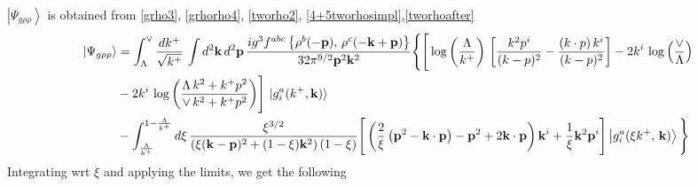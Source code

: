 \documentclass[aps,prd,amsmath,amssymb,nofootinbib]{revtex4-2}
\numberwithin{equation}{section}
\begin{document}
$\left|\Psi_{g\rho\rho}\right\rangle$ is obtained from \eqref{grho3}, \eqref{grhorho4}, \eqref{tworho2}, \eqref{4+5tworhosimpl},\eqref{tworhoafter}
\begin{align}\label{combinedgrhorho}
    \left|\Psi_{g\rho\rho}\right\rangle & =  \int_{\Lambda}^{\vee}\frac{dk^{+}}{\sqrt{k^{+}}}\,\int d^{2}\mathbf{k}\, d^{2}\mathbf{p}\,\frac{ig^{3}f^{abc}\left\{ \rho^{b}(-\mathbf{p}),\,\rho^{c}(-\mathbf{k}+\mathbf{p})\right\}}{32\pi^{9/2}\mathbf{p}^{2}\mathbf{k}^{2}}\Bigg\{\Bigg[\log{\left(\frac{\Lambda}{k^{+}}\right)}\,\left[\frac{k^{2}p^{i}}{(k-p)^{2}}-\frac{(k\cdot p)\,k^{i}}{(k-p)^{2}}\right]-2k^{i}\,\log{\left(\frac{\vee}{\Lambda}\right)}\notag \\ & -2k^{i}\,\log{\left(\frac{\Lambda\,k^{2} + k^{+}p^{2}}{\vee\, k^{2}+k^{+}p^{2}}\right)}\Bigg]\, \ket{g^{a}_{i}(k^{+},\mathbf{k})} \notag \\ & -\int_{\frac{\Lambda}{k^{+}}}^{1-\frac{\Lambda}{k^{+}}}d\xi\,\frac{\xi^{3/2}}{\left(\xi(\mathbf{k}-\mathbf{p})^{2}+(1-\xi)\mathbf{k}^{2}\right)(1-\xi)}\Bigg[\left(\frac{2}{\xi}\left(\mathbf{p}^{2}-\mathbf{k}\cdot\mathbf{p}\right)-\mathbf{p}^{2}+2\mathbf{k}\cdot\mathbf{p}\right)\mathbf{k}^{i} +\frac{1}{\xi}\mathbf{k}^{2}\mathbf{p}^{i}\Bigg]\left|g_{i}^{a}(\xi k^{+},\,\mathbf{k})\right\rangle \Bigg\} 
\end{align}
Integrating wrt $\xi$ and applying the limits, we get the following
\end{document}
